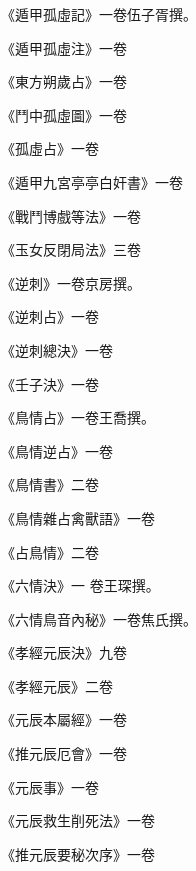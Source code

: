 \begin{pinyinscope}
 《遁甲孤虛記》一卷伍子胥撰。



 《遁甲孤虛注》一卷



 《東方朔歲占》一卷



 《鬥中孤虛圖》一卷



 《孤虛占》一卷



 《遁甲九宮亭亭白奸書》一卷



 《戰鬥博戲等法》一卷



 《玉女反閉局法》三卷



 《逆刺》一卷京房撰。



 《逆刺占》一卷



 《逆刺總決》一卷



 《壬子決》一卷



 《鳥情占》一卷王喬撰。



 《鳥情逆占》一卷



 《鳥情書》二卷



 《鳥情雜占禽獸語》一卷



 《占鳥情》二卷



 《六情決》一
 卷王琛撰。



 《六情鳥音內秘》一卷焦氏撰。



 《孝經元辰決》九卷



 《孝經元辰》二卷



 《元辰本屬經》一卷



 《推元辰厄會》一卷



 《元辰事》一卷



 《元辰救生削死法》一卷



 《推元辰要秘次序》一卷




\end{pinyinscope}
